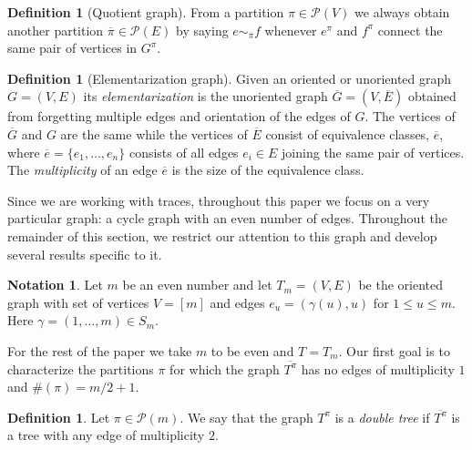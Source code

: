 \documentclass{article}
\theoremstyle{definition}
\newtheorem{notation}   [theorem]{Notation}
\newtheorem{definition} [theorem]{Definition}
\newcommand{\cP}{\mathcal{P}}
\begin{document}
{\begin{definition}[Quotient graph]
From a partition $\pi \in \cP(V)$ we always obtain another partition $\overline{\pi} \in \cP(E)$ by saying $e \sim_{\overline{\pi}} f$ whenever $e^\pi$ and $f^\pi$ connect the same pair of vertices in $G^\pi$.
\end{definition}

\begin{definition}[Elementarization graph]
Given an oriented or unoriented graph $G=(V,E)$ its \textit{elementarization} is the unoriented graph $\overline{G}=(V,\overline{E})$ obtained from forgetting multiple edges and orientation of the edges of $G$. The vertices of $\overline{G}$ and $G$ are the same while the vertices of $\overline{E}$ consist of equivalence classes, $\overline{e}$, where $\overline{e}=\{e_1,\dots,e_n\}$ consists of all edges $e_i\in E$ joining the same pair of vertices. The \textit{multiplicity} of an edge $\overline{e}$ is the size of the equivalence class. 
\end{definition}

Since we are working with traces, throughout this paper we focus on a very particular graph: a cycle graph with an even number of edges. Throughout the remainder of this section, we restrict our attention to this graph and develop several results specific to it.

\begin{notation}\label{Notation: Graph m cycle}
Let $m$ be an even number and let $T_m=(V,E)$ be the oriented graph with set of vertices $V=[m]$ and edges $e_u=(\gamma(u),u)$ for $1\leq u\leq m$. Here $\gamma=(1,\dots,m)\in S_m$.
\end{notation}

For the rest of the paper we take $m$ to be even and $T=T_m$. Our first goal is to characterize the partitions $\pi$ for which the graph $\overline{T^\pi}$ has no edges of multiplicity $1$ and $\#(\pi)=m/2+1$.

\begin{definition}\label{Definition: Double tree}
Let $\pi\in \cP(m)$. We say that the graph $T^\pi$ is a \textit{double tree} if $\overline{T^\pi}$ is a tree with any edge of multiplicity $2$. 
\end{definition}

}
\end{document}
